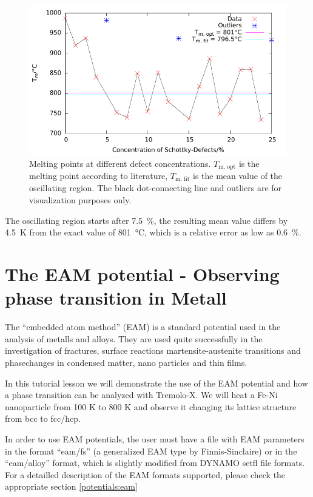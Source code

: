 \begin{figure}[h]
    \centering
    \includegraphics{visuals/nacl_melting.pdf}
    \caption{Melting points at different defect concentrations.
        $T_\textrm{m, opt}$ is the melting point according to literature,
        $T_\textrm{m, fit}$ is the mean value of the oscillating region.
        The black dot-connecting line and outliers are for visualization
    purposes only.}
\end{figure}

The oscillating region starts after \SI{7.5}{\percent}, the resulting
mean value differs by \SI{4.5}{\kelvin} from the exact value of
\SI{801}{\celsius}, which is a relative error as low as
\SI{0.6}{\percent}.

\section{The EAM potential - Observing phase transition in Metall}

The ``embedded atom method'' (EAM) is a standard potential used in the analysis of metalls and alloys.
They are used quite successfully in the investigation of fractures, surface reactions martensite-austenite transitions
and phasechanges in condensed matter, nano particles and thin films.

In this tutorial lesson we will demonstrate the use of the EAM potential and how a phase transition
can be analyzed with Tremolo-X. 
We will heat a Fe-Ni nanoparticle from 100 K to 800 K and observe it changing its lattice structure from
bcc to fcc/hcp.

In order to use EAM potentials, the user must have a file with EAM parameters in the format ``eam/fs'' (a generalized EAM type by Finnis-Sinclaire) or 
in the ``eam/alloy'' format, which is slightly modified from DYNAMO setfl file formats. For a detailled description of the EAM formats supported, please
check the appropriate section \ref{potentials:eam}

